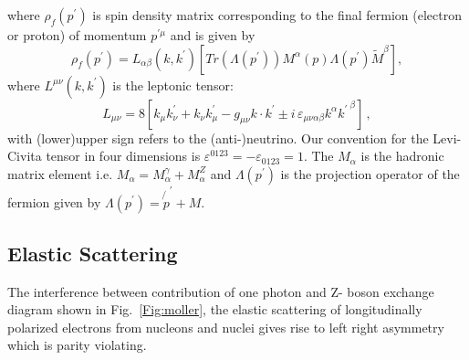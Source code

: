 where $\rho_f(p^\prime)$ is spin density matrix  corresponding to the final fermion (electron or proton) of momentum $p^{\prime\mu}$ and is given by 
\begin{equation}
\rho_f(p^\prime)= L_{ \alpha \beta}(k,k^\prime)[Tr(\Lambda(p^\prime) )M^\alpha(p)\Lambda(p^\prime)\tilde{M}^\beta] ,
\end{equation}
where $L^{\mu \nu}(k,k^\prime)$ is the leptonic tensor: 
\begin{equation}\label{eq:lmunu}
    L_{\mu \nu}= 8 \left[  k_\mu  k^\prime_\nu  +  k_\nu  k^\prime_\mu  - g_{\mu \nu} k \cdot k^\prime 
    \pm  i \, \varepsilon_{\mu \nu \alpha \beta} k^\alpha {k^\prime \,}^\beta \right] \, ,
\end{equation}
with (lower)upper sign refers to the (anti-)neutrino. Our convention for the Levi-Civita tensor in four dimensions is 
$\varepsilon^{0123}=-\varepsilon_{0123}=1$. The $M_\alpha$ is the hadronic matrix element i.e. $M_\alpha=M_\alpha^\gamma+M_\alpha^Z$ and $\Lambda(p^\prime)$ is the projection operator of the fermion given by $\Lambda(p^\prime)=\not{p}^\prime+M$.

\subsection{Elastic Scattering}

The interference between contribution of one photon and Z- boson  exchange diagram shown in Fig.~\ref{Fig:moller}, the elastic scattering of longitudinally polarized electrons from nucleons and nuclei gives rise to left right asymmetry which is parity violating. 

